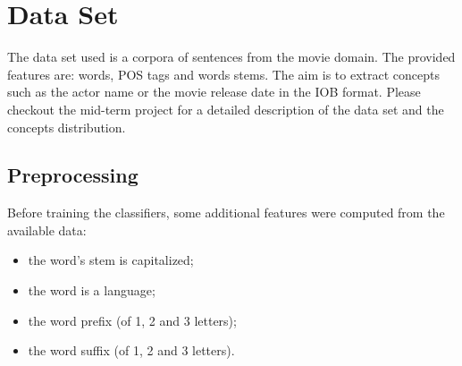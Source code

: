 \section{Data Set}
\label{sec:dataset}

The data set used is a corpora of sentences from the movie domain.
The provided features are: words, \ac{POS} tags and words stems.
The aim is to extract concepts such as the actor name or the movie release date in the \ac{IOB} format.
Please checkout the mid-term project for a detailed description of the data set and the concepts distribution.

\subsection{Preprocessing}
\label{subsection:preprocessing}

Before training the classifiers, some additional features were computed from the available data:
\begin{itemize}
    \item the word's stem is capitalized;
    \item the word is a language;
    \item the word prefix (of 1, 2 and 3 letters);
    \item the word suffix (of 1, 2 and 3 letters).
\end{itemize}
